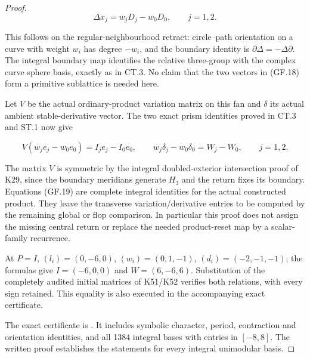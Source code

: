 \begin{proof}
\[
 \Delta x_j=w_jD_j-w_0D_0,\qquad j=1,2.               \tag{GF.18}
\]

This follows on the regular-neighbourhood retract: circle--path
orientation on a curve with weight \(w_i\) has degree \(-w_i\), and
the boundary identity is \(\partial\Delta=-\Delta\partial\). The
integral boundary map identifies the relative three-group with
the complex curve sphere basis, exactly as in CT.3. No claim
that the two vectors in (GF.18) form a primitive sublattice is
needed here.

Let \(V\) be the actual ordinary-product variation matrix on this
fan and \(\delta\) its actual ambient stable-derivative vector. The
two exact prism identities proved in CT.3 and ST.1 now give

\[
 V(w_je_j-w_0e_0)=I_je_j-I_0e_0,\qquad
 w_j\delta_j-w_0\delta_0=W_j-W_0,\qquad j=1,2.        \tag{GF.19}
\]

The matrix \(V\) is symmetric by the integral doubled-exterior
intersection proof of K29, since the boundary meridians generate
\(H_3\) and the return fixes its boundary. Equations (GF.19) are
complete integral identities for the actual constructed product.
They leave the transverse variation/derivative entries to be
computed by the remaining global or flop comparison. In particular
this proof does not assign the missing central return or replace
the needed product-reset map by a scalar-family recurrence.

At \(P=I\), \((l_i)=(0,-6,0)\), \((w_i)=(0,1,-1)\),
\((d_i)=(-2,-1,-1)\); the formulas give \(I=(-6,0,0)\) and \(W=(6,-6,6)\).
Substitution of the completely audited initial matrices of K51/K52
verifies both relations, with every sign retained. This equality
is also executed in the accompanying exact certificate.

The exact certificate is . It includes symbolic character, period, contraction and orientation identities, and all 1384 integral bases with entries in \([-8,8]\). The written proof establishes the statements for every integral unimodular basis.
\end{proof}
